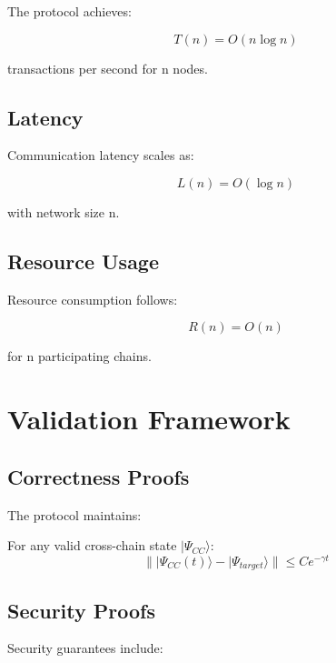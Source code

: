\documentclass[12pt]{article}
\begin{document}
The protocol achieves:

\begin{equation}
T(n) = O(n\log n)
\end{equation}

transactions per second for n nodes.

\subsection{Latency}

Communication latency scales as:

\begin{equation}
L(n) = O(\log n)
\end{equation}

with network size n.

\subsection{Resource Usage}

Resource consumption follows:

\begin{equation}
R(n) = O(n)
\end{equation}

for n participating chains.

\section{Validation Framework}

\subsection{Correctness Proofs}

The protocol maintains:

\begin{theorem}
For any valid cross-chain state $|\Psi_{CC}\rangle$:
\begin{equation}
\||\Psi_{CC}(t)\rangle - |\Psi_{target}\rangle\| \leq Ce^{-\gamma t}
\end{equation}
\end{theorem}

\subsection{Security Proofs}

Security guarantees include:
\end{document}
